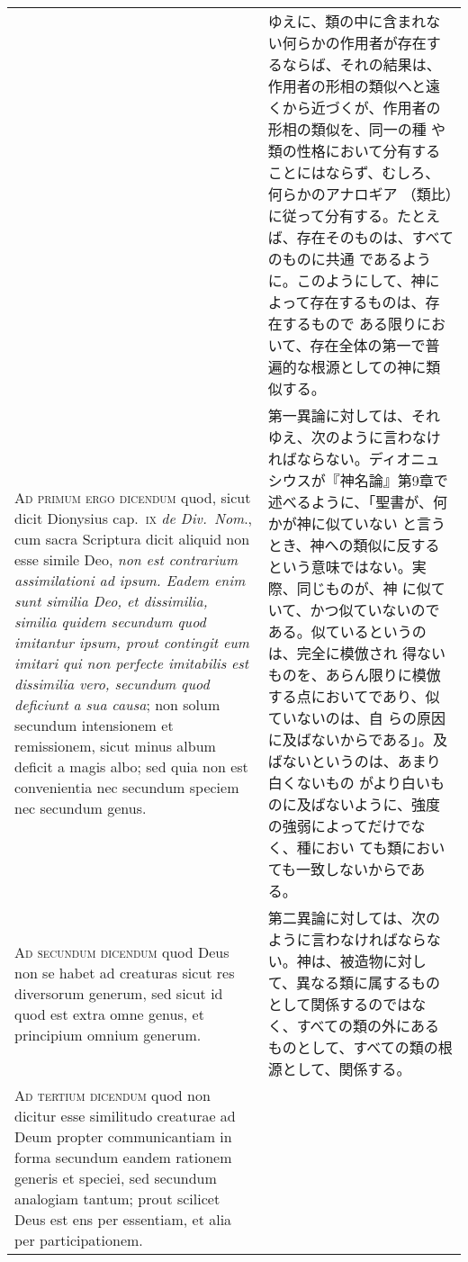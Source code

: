 \documentclass[10pt]{jsarticle}
\begin{document}
\begin{longtable}{p{21em}p{21em}}
&

ゆえに、類の中に含まれない何らかの作用者が存在するならば、それの結果は、
作用者の形相の類似へと遠くから近づくが、作用者の形相の類似を、同一の種
や類の性格において分有することにはならず、むしろ、何らかのアナロギア
（類比）に従って分有する。たとえば、存在そのものは、すべてのものに共通
であるように。このようにして、神によって存在するものは、存在するもので
ある限りにおいて、存在全体の第一で普遍的な根源としての神に類似する。

\\

{\scshape Ad primum ergo dicendum} quod, sicut dicit Dionysius
cap.~{\scshape ix} {\itshape de Div.~Nom}., cum sacra Scriptura dicit
aliquid non esse simile Deo, {\itshape non est contrarium
assimilationi ad ipsum. Eadem enim sunt similia Deo, et dissimilia,
similia quidem secundum quod imitantur ipsum, prout contingit eum
imitari qui non perfecte imitabilis est dissimilia vero, secundum quod
deficiunt a sua causa}; non solum secundum intensionem et remissionem,
sicut minus album deficit a magis albo; sed quia non est convenientia
nec secundum speciem nec secundum genus.

&

第一異論に対しては、それゆえ、次のように言わなければならない。ディオニュ
シウスが『神名論』第9章で述べるように、「聖書が、何かが神に似ていない
と言うとき、神への類似に反するという意味ではない。実際、同じものが、神
に似ていて、かつ似ていないのである。似ているというのは、完全に模倣され
得ないものを、あらん限りに模倣する点においてであり、似ていないのは、自
らの原因に及ばないからである」。及ばないというのは、あまり白くないもの
がより白いものに及ばないように、強度の強弱によってだけでなく、種におい
ても類においても一致しないからである。


\\

{\scshape Ad secundum dicendum} quod Deus non se habet ad creaturas
sicut res diversorum generum, sed sicut id quod est extra omne genus,
et principium omnium generum.  

&

第二異論に対しては、次のように言わなければならない。神は、被造物に対し
て、異なる類に属するものとして関係するのではなく、すべての類の外にある
ものとして、すべての類の根源として、関係する。

\\

{\scshape Ad tertium dicendum} quod non dicitur esse similitudo
creaturae ad Deum propter communicantiam in forma secundum eandem
rationem generis et speciei, sed secundum analogiam tantum; prout
scilicet Deus est ens per essentiam, et alia per participationem.


\end{longtable}
\end{document}
